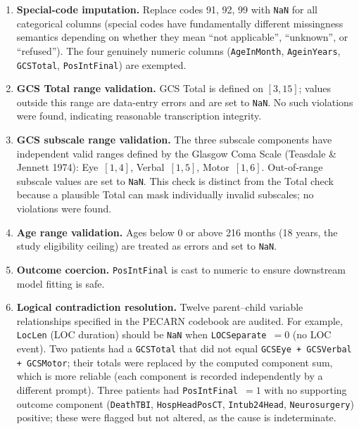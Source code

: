 \documentclass[10pt,letterpaper]{article}
\begin{document}
\begin{enumerate}
  \item \textbf{Special-code imputation.}  Replace codes 91, 92, 99 with \texttt{NaN} for all
        categorical columns (special codes have fundamentally different missingness semantics
        depending on whether they mean ``not applicable'', ``unknown'', or ``refused'').
        The four genuinely numeric columns (\texttt{AgeInMonth}, \texttt{AgeinYears},
        \texttt{GCSTotal}, \texttt{PosIntFinal}) are exempted.

  \item \textbf{GCS Total range validation.}  GCS Total is defined on $[3,15]$; values outside
        this range are data-entry errors and are set to \texttt{NaN}.
        No such violations were found, indicating reasonable transcription integrity.

  \item \textbf{GCS subscale range validation.}  The three subscale components have independent
        valid ranges defined by the Glasgow Coma Scale (Teasdale \& Jennett 1974):
        Eye~$[1,4]$, Verbal~$[1,5]$, Motor~$[1,6]$.
        Out-of-range subscale values are set to \texttt{NaN}.
        This check is distinct from the Total check because a plausible Total can mask
        individually invalid subscales; no violations were found.

  \item \textbf{Age range validation.}  Ages below 0 or above 216 months (18 years, the study
        eligibility ceiling) are treated as errors and set to \texttt{NaN}.

  \item \textbf{Outcome coercion.}  \texttt{PosIntFinal} is cast to numeric to ensure
        downstream model fitting is safe.

  \item \textbf{Logical contradiction resolution.}  Twelve parent--child variable relationships
        specified in the PECARN codebook are audited.  For example, \texttt{LocLen} (LOC
        duration) should be \texttt{NaN} when \texttt{LOCSeparate}~$= 0$ (no LOC event).
        Two patients had a \texttt{GCSTotal} that did not equal \texttt{GCSEye + GCSVerbal +
        GCSMotor}; their totals were replaced by the computed component sum, which is more
        reliable (each component is recorded independently by a different prompt).
        Three patients had \texttt{PosIntFinal}~$= 1$ with no supporting outcome component
        (\texttt{DeathTBI}, \texttt{HospHeadPosCT}, \texttt{Intub24Head}, \texttt{Neurosurgery})
        positive; these were flagged but not altered, as the cause is indeterminate.


\end{enumerate}
\end{document}
